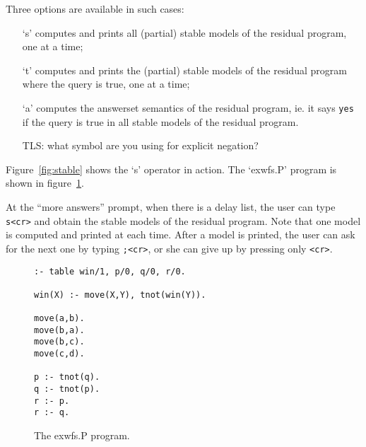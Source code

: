 Three options are available in such cases: 

\begin{enumerate}

\item[`s'] computes and prints all (partial) stable models of the residual
  program, one at a time;

\item[`t'] computes and prints the (partial) stable models of the residual
  program where the query is true, one at a time;

\item[`a'] computes the answerset semantics of the residual program,
  ie. it says \verb#yes# if the query is true in all stable models of the
  residual program.

{\sc TLS: what symbol are you using for explicit negation?}

\end{enumerate}

Figure~\ref{fig:stable} shows the `s' operator in action. The
`exwfs.P' program is shown in figure~\ref{fig:exwfs}. 

At the ``more answers'' prompt, when there is a delay list, the user
can type \verb#s<cr># and obtain the stable models of the residual program.
Note that one model is computed and printed at each time. After a
model is printed, the user can ask for the next one by typing \verb#;<cr>#,
or she can give up by pressing only \verb#<cr>#.

\begin{figure}
\label{fig:exwfs}
\centering
\scriptsize
\begin{verbatim}
:- table win/1, p/0, q/0, r/0.

win(X) :- move(X,Y), tnot(win(Y)).

move(a,b).
move(b,a).
move(b,c).
move(c,d).

p :- tnot(q).
q :- tnot(p).
r :- p.
r :- q.
\end{verbatim}
\caption{The exwfs.P program.}
\end{figure}


